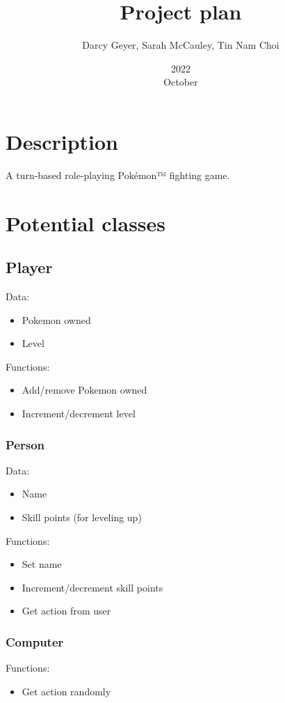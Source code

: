 \documentclass{article}
\title{Project plan}
\author{Darcy Geyer, Sarah McCauley, Tin Nam Choi}
\date{2022\\October}
\begin{document}
  \maketitle{}
  
  \tableofcontents{}
  
  \pagebreak
  
  \section{Description}
  A turn-based role-playing Pokémon™ fighting game. 
  
  \lipsum[1]
  
  \pagebreak

  \section{Potential classes}
  
  \subsection{Player}
  Data: 
  \begin{itemize}
    \item Pokemon owned
    \item Level 
  \end{itemize}
  Functions:
  \begin{itemize}
    \item Add/remove Pokemon owned
    \item Increment/decrement level
  \end{itemize}
  
  \subsubsection{Person}
  Data:
  \begin{itemize}
    \item Name
    \item Skill points (for leveling up)
  \end{itemize}
  Functions:
  \begin{itemize}
    \item Set name
    \item Increment/decrement skill points
    \item Get action from user
  \end{itemize}
  
  \subsubsection{Computer}
  Functions:
  \begin{itemize}
    \item Get action randomly
  \end{itemize}
    
\end{document}
